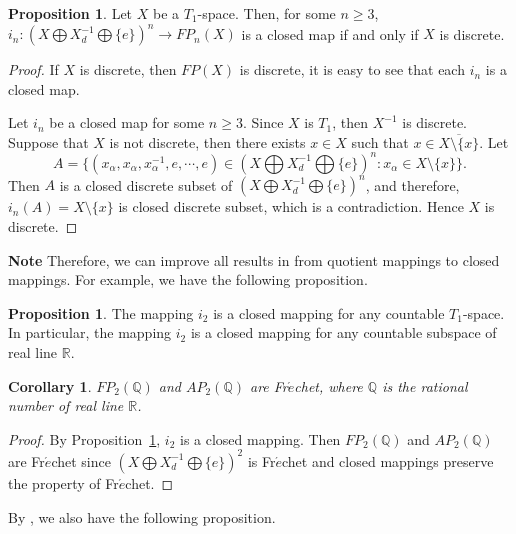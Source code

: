\documentclass{amsart}
\newtheorem{corollary}[theorem]{Corollary}
\theoremstyle{definition}
\newtheorem{proposition}[theorem]{Proposition}
\begin{document}
\begin{proposition}
Let $X$ be a $T_1$-space. Then, for some $n\geq 3$, $i_n:  (X\bigoplus X_{d}^{-1}\bigoplus\{e\})^{n}\rightarrow FP_{n}(X)$ is a closed map if and only if $X$ is discrete.
\end{proposition}

\begin{proof}
If $X$ is discrete, then $FP(X)$ is discrete, it is easy to see that each $i_n$ is a closed map.

\smallskip

Let $i_n$ be a closed map for some $n\geq 3$. Since $X$ is $T_1$, then $X^{-1}$ is discrete. Suppose that $X$ is not discrete, then there exists $x\in X$ such that $x\in \overline {X\setminus \{x\}}$.
Let $$A=\{(x_\alpha, x_\alpha, x_\alpha^{-1}, e, \cdots, e)\in(X\bigoplus X_{d}^{-1}\bigoplus\{e\})^n: x_\alpha \in X\setminus \{x\}\}.$$ Then $A$ is a closed discrete subset of $(X\bigoplus X_{d}^{-1}\bigoplus\{e\})^n$, and therefore, $i_n(A)=X\setminus \{x\}$ is closed discrete subset, which is a contradiction. Hence $X$ is discrete.
\end{proof}


{\bf Note} Therefore, we can improve all results in \cite[Sections 4 and 5]{EN2013} from quotient mappings to closed mappings. For example, we have the following proposition.




\begin{proposition}\label{p0}
The mapping $i_{2}$ is a closed mapping for any countable $T_1$-space. In particular, the mapping $i_{2}$ is a closed mapping for any countable subspace of real line $\mathbb{R}$.
\end{proposition}

\begin{corollary}
$FP_{2}(\mathbb{Q})$ and $AP_{2}(\mathbb{Q})$ are Fr$\acute{e}$chet, where $\mathbb{Q}$ is the rational number of real line $\mathbb{R}$.
\end{corollary}

\begin{proof}
By Proposition~\ref{p0}, $i_{2}$ is a closed mapping. Then $FP_{2}(\mathbb{Q})$ and $AP_{2}(\mathbb{Q})$ are Fr$\acute{e}$chet since $(X\bigoplus X_{d}^{-1}\bigoplus\{e\})^{2}$ is Fr$\acute{e}$chet and closed mappings preserve the property of Fr$\acute{e}$chet.
\end{proof}

By \cite[Proposition 6.26]{F1982}, we also have the following proposition.
\end{document}
